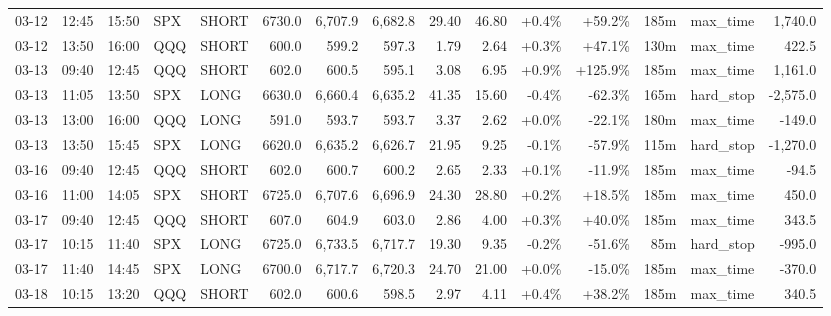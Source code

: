 \documentclass[11pt,a4paper,twoside]{article}
\begin{document}
\begin{landscape}
\begin{center}
\begin{longtable}{>{\color{txtmain}}l l l l l r r r r r r r r >{\color{txtmain}}l r}
03-12 & 12:45 & 15:50 & SPX & SHORT & 6730.0 & 6,707.9 & 6,682.8 & 29.40 & 46.80 & \textcolor{wingreen}{+0.4\%} & \textcolor{wingreen}{+59.2\%} & 185m & max\_time & \textcolor{wingreen}{1,740.0} \\
03-12 & 13:50 & 16:00 & QQQ & SHORT & 600.0 & 599.2 & 597.3 & 1.79 & 2.64 & \textcolor{wingreen}{+0.3\%} & \textcolor{wingreen}{+47.1\%} & 130m & max\_time & \textcolor{wingreen}{422.5} \\
03-13 & 09:40 & 12:45 & QQQ & SHORT & 602.0 & 600.5 & 595.1 & 3.08 & 6.95 & \textcolor{wingreen}{+0.9\%} & \textcolor{wingreen}{+125.9\%} & 185m & max\_time & \textcolor{wingreen}{1,161.0} \\
03-13 & 11:05 & 13:50 & SPX & LONG & 6630.0 & 6,660.4 & 6,635.2 & 41.35 & 15.60 & \textcolor{lossred}{-0.4\%} & \textcolor{lossred}{-62.3\%} & 165m & hard\_stop & \textcolor{lossred}{-2,575.0} \\
03-13 & 13:00 & 16:00 & QQQ & LONG & 591.0 & 593.7 & 593.7 & 3.37 & 2.62 & \textcolor{wingreen}{+0.0\%} & \textcolor{lossred}{-22.1\%} & 180m & max\_time & \textcolor{lossred}{-149.0} \\
03-13 & 13:50 & 15:45 & SPX & LONG & 6620.0 & 6,635.2 & 6,626.7 & 21.95 & 9.25 & \textcolor{lossred}{-0.1\%} & \textcolor{lossred}{-57.9\%} & 115m & hard\_stop & \textcolor{lossred}{-1,270.0} \\
03-16 & 09:40 & 12:45 & QQQ & SHORT & 602.0 & 600.7 & 600.2 & 2.65 & 2.33 & \textcolor{wingreen}{+0.1\%} & \textcolor{lossred}{-11.9\%} & 185m & max\_time & \textcolor{lossred}{-94.5} \\
03-16 & 11:00 & 14:05 & SPX & SHORT & 6725.0 & 6,707.6 & 6,696.9 & 24.30 & 28.80 & \textcolor{wingreen}{+0.2\%} & \textcolor{wingreen}{+18.5\%} & 185m & max\_time & \textcolor{wingreen}{450.0} \\
03-17 & 09:40 & 12:45 & QQQ & SHORT & 607.0 & 604.9 & 603.0 & 2.86 & 4.00 & \textcolor{wingreen}{+0.3\%} & \textcolor{wingreen}{+40.0\%} & 185m & max\_time & \textcolor{wingreen}{343.5} \\
03-17 & 10:15 & 11:40 & SPX & LONG & 6725.0 & 6,733.5 & 6,717.7 & 19.30 & 9.35 & \textcolor{lossred}{-0.2\%} & \textcolor{lossred}{-51.6\%} & 85m & hard\_stop & \textcolor{lossred}{-995.0} \\
03-17 & 11:40 & 14:45 & SPX & LONG & 6700.0 & 6,717.7 & 6,720.3 & 24.70 & 21.00 & \textcolor{wingreen}{+0.0\%} & \textcolor{lossred}{-15.0\%} & 185m & max\_time & \textcolor{lossred}{-370.0} \\
03-18 & 10:15 & 13:20 & QQQ & SHORT & 602.0 & 600.6 & 598.5 & 2.97 & 4.11 & \textcolor{wingreen}{+0.4\%} & \textcolor{wingreen}{+38.2\%} & 185m & max\_time & \textcolor{wingreen}{340.5} \\

\end{longtable}
\end{center}
\end{landscape}
\end{document}
